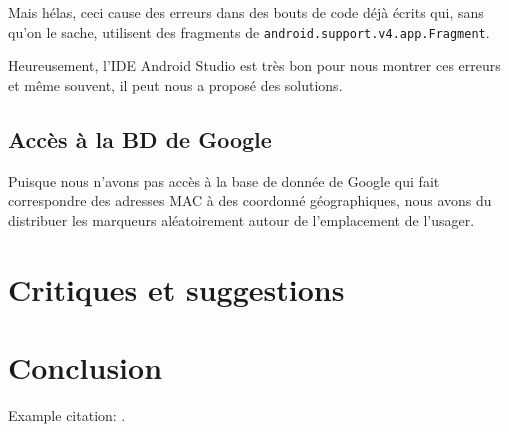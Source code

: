 \documentclass[12pt]{article}
\newcommand\code[1]{\texttt{#1}}
\begin{document}
	Mais hélas, ceci cause des erreurs dans des bouts de code déjà écrits qui,
	sans qu'on le sache, utilisent des fragments de
	\code{android.support.v4.app.Fragment}.

	Heureusement, l'IDE Android Studio est très bon pour nous montrer ces
	erreurs et même souvent, il peut nous a proposé des solutions.

\subsection{Accès à la BD de Google}

	Puisque nous n'avons pas accès à la base de donnée de Google qui fait
	correspondre des adresses MAC à des coordonné géographiques, nous avons du
	distribuer les marqueurs aléatoirement autour de l'emplacement de
	l'usager.



\section{Critiques et suggestions}
\section{Conclusion}
Example citation: .



\end{document}
